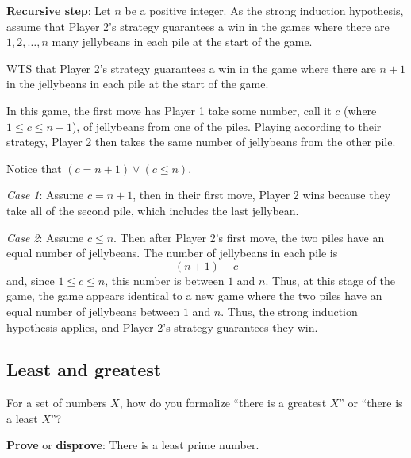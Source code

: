 \documentclass[12pt, oneside]{article}
\begin{document}
{\bf Recursive step}: Let $n$ be a positive integer. 
As the strong induction hypothesis, assume that
Player 2's strategy guarantees a win in the games 
where there are $1, 2, \ldots, n$ many jellybeans in each 
pile at the start of the game.

WTS that Player 2's strategy guarantees a win in the game where
there are $n+1$ in the jellybeans in each pile at the start of the game.

In this game, the first move has Player 1 take 
some number, call it $c$ (where $1 \leq c \leq n+1$),
of jellybeans from one of the piles. 
Playing according to their strategy, Player 2 then 
takes the same number of jellybeans from  the other pile.

Notice that $(c = n+1) \lor (c \leq n)$.

{\it Case 1}: Assume $c = n+1$, then in their first move, 
Player 2 wins because they take all of the second pile, which 
includes the last jellybean.

{\it Case 2}: Assume $c \leq n$. Then after Player 2's first move,
the two piles have an equal number of jellybeans. The number
of jellybeans in each pile is 
\[
    (n+1) - c
\]
and, since $1 \leq c \leq n$, this number is between $1$ and $n$.
Thus, at this stage of the game, the game appears identical to a new 
game where the two piles have an equal number of jellybeans between $1$
and $n$. Thus, the strong induction hypothesis applies, and Player 2's
strategy guarantees they win.

 \newpage



 \subsection*{Least and greatest}


For a set of numbers $X$, how do you formalize ``there is a greatest $X$'' 
or ``there is a least $X$''?

\vspace{30pt}

{\bf Prove} or {\bf  disprove}:  There is a least prime number.
\end{document}
